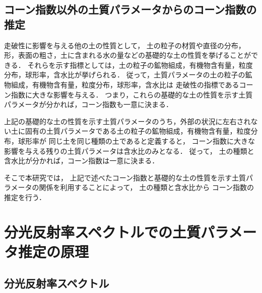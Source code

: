 \subsection{コーン指数以外の土質パラメータからのコーン指数の推定}
\label{ssec:ConeindexEstimation}

走破性に影響を与える他の土の性質として，%
土の粒子の材質や直径の分布，形，表面の粗さ，土に含まれる水の量などの基礎的な土の性質を挙げることができる\cite{小田1971}\cite{Okello1991}\cite{Shoop1993}\cite{Flores2014}．
それらを示す指標としては，土の粒子の鉱物組成，有機物含有量，粒度分布，球形率，含水比が挙げられる．%
従って，土質パラメータの土の粒子の鉱物組成，有機物含有量，粒度分布，球形率，含水比は
走破性の指標であるコーン指数に大きな影響を与える\cite{Collins1971}．%
つまり，これらの基礎的な土の性質を示す土質パラメータが分かれば，コーン指数も一意に決まる\cite{Ayers1982}\cite{Jenkins1985}\cite{Elbanna1987}\cite{Mulhearn2001}．

上記の基礎的な土の性質を示す土質パラメータのうち，外部の状況に左右されない土に固有の土質パラメータである土の粒子の鉱物組成，有機物含有量，粒度分布，球形率が
同じ土を同じ種類の土であると定義すると，
コーン指数に大きな影響を与える残りの土質パラメータは含水比のみとなる．
従って，
土の種類と含水比が分かれば，コーン指数は一意に決まる．

そこで本研究では，
上記で述べたコーン指数と基礎的な土の性質を示す土質パラメータの関係を利用することによって，
土の種類と含水比から
コーン指数の推定を行う．

\clearpage

\section{分光反射率スペクトルでの土質パラメータ推定の原理}
\label{sec:SpectrumAndMaterialRelationship}

\subsection{分光反射率スペクトル}
\label{ssec:Spectrum}

